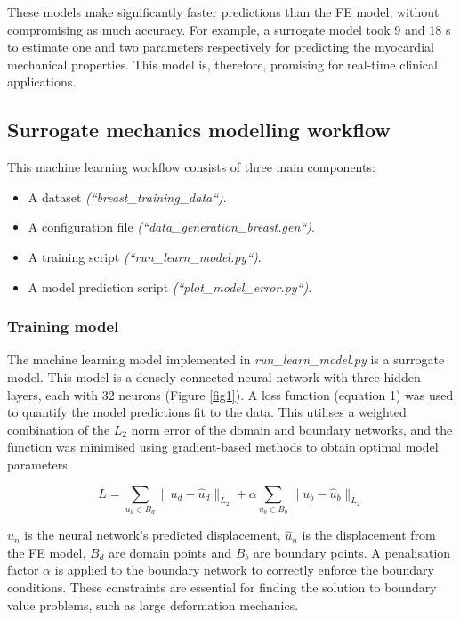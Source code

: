 \documentclass[11pt]{article}
\providecommand{\tightlist}{%
      \setlength{\itemsep}{0pt}\setlength{\parskip}{0pt}}
\begin{document}
 These models make significantly faster predictions than the FE model, without compromising as much accuracy. For example, a surrogate model took 9 and 18 s to estimate one and two parameters respectively for predicting the myocardial mechanical properties. This model is, therefore, promising for real-time clinical applications.

\subsection{Surrogate mechanics modelling workflow}
This machine learning workflow consists of three main components:

\begin{itemize}
\tightlist
\item A dataset \textit{(``breast\_training\_data``)}.
\item A configuration file \textit{(``data\_generation\_breast.gen``)}.
\item A training script \textit{(``run\_learn\_model.py``)}.
\item A model prediction script \textit{(``plot\_model\_error.py``)}.

\end{itemize}

\subsubsection{Training model}
The machine learning model implemented in \textit{run\_learn\_model.py} is a surrogate model. This model is a densely connected neural network with three hidden layers, each with 32 neurons (Figure \ref{fig1}). A loss function (equation 1) was used to quantify the model predictions fit to the data. This utilises a weighted combination of the $L_{2}$ norm error of the domain and boundary networks, and the function was minimised using gradient-based methods to obtain optimal model parameters.

\begin{equation}
    L = \sum_{u_{d}\in B_{d}}\|u_{d}-\hat{u}_{d}\|_{L_{2}} + \alpha\sum_{u_{b}\in B_{b}}\|u_{b}-\hat{u}_{b}\|_{L_{2}}
\end{equation}

$u_{n}$ is the neural network's predicted displacement, $\hat{u}_{n}$ is the displacement from the FE model, $B_{d}$ are domain points and $B_{b}$ are boundary points. A penalisation factor $\alpha$ is applied to the boundary network to correctly enforce the boundary conditions. These constraints are essential for finding the solution to boundary value problems, such as large deformation mechanics.
\end{document}
